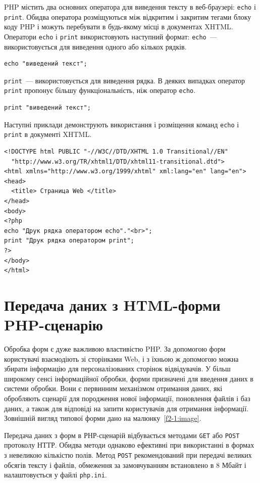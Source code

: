 PHP містить два основних оператора для виведення тексту в веб-браузері: \verb|echo| і  \verb|print|. Обидва оператора розміщуються між відкритим і закритим тегами блоку коду PHP і можуть перебувати в будь-якому місці в документах XHTML. Оператори  \verb|echo| і  \verb|print| використовують наступний формат:
\verb|echo|~--- використовується для виведення одного або кількох рядків.
\begin{verbatim}
echo "виведений текст";
\end{verbatim}
 \verb|print|~--- використовується для виведення рядка. В деяких випадках оператор  \verb|print| пропонує більшу функціональність, ніж оператор  \verb|echo|.
\begin{verbatim}
print "виведений текст";
\end{verbatim}
Наступні приклади демонструють використання і розміщення команд  \verb|echo| і  \verb|print| в документі XHTML.



\begin{lstlisting}[caption=Приклад вживання команд echo і print]
<!DOCTYPE html PUBLIC "-//W3C//DTD/XHTML 1.0 Transitional//EN"
  "http://www.w3.org/TR/xhtml1/DTD/xhtml11-transitional.dtd">
<html xmlns="http://www.w3.org/1999/xhtml" xml:lang="en" lang="en">
<head>
  <title> Страница Web </title>
</head>
<body>
<?php 
echo "Друк рядка оператором echo"."<br>";
print "Друк рядка оператором print";
?>
</body>
</html>
\end{lstlisting}



\pagebreak[3]
\section{Передача даних з HTML-форми PHP-сценарію}
\nopagebreak[4]
Обробка форм є дуже важливою властивістю PHP. За допомогою форм користувачі взаємодіють зі сторінками Web, і з їхньою ж допомогою можна збирати інформацію для персоналізованих сторінок відвідувачів. У більш широкому сенсі інформаційної обробки, форми призначені для введення даних в системи обробки. Вони є первинним механізмом отримання даних, які обробляють сценарії для породження нової інформації, поновлення файлів і баз даних, а також для відповіді на запити користувачів для отримання інформації. Зовнішній вигляд типової форми дано на малюнку~\ref{f2-1:image}.

Передача даних з форм в РНР-сценарій відбувається методами  \verb|GET| або  \verb|POST| протоколу НТТР. Обидва методи однаково ефективні при використанні в формах з невеликою кількістю полів. Метод  \verb|POST| рекомендований при передачі великих обсягів тексту і файлів, обмеження за замовчуванням встановлено в 8 Мбайт і налаштовується у файлі  \verb|php.ini|.

